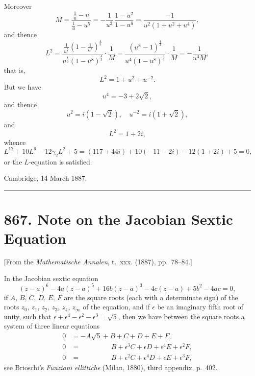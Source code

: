\documentclass[11pt,a4paper]{article}
\theoremstyle{definition}
\begin{document}
Moreover
\[M = \frac{\tfrac{1}{u} - u}{\tfrac{1}{u} - u^5} = -\frac{1}{u^2}\, \frac{1 - u^2}{1 - u^6} = \frac{-1}{u^2(1 + u^2 + u^4)},\]
and thence
\[L^2 = \frac{\tfrac{1}{u^{\frac{8}{3}}}(1 - \tfrac{1}{u^8})^{\frac{4}{3}}}{u^{\frac{8}{3}}(1 - u^8)^{\frac{4}{3}}} \cdot \frac{1}{M} = \frac{(u^8 - 1)^{\frac{4}{3}}}{u^4(1 - u^8)^{\frac{4}{3}}} \cdot \frac{1}{M} = -\frac{1}{u^4M},\]
that is,
\[L^2 = 1 + u^2 + u^{-2}.\]
But we have
\[u^4 = -3 + 2\sqrt{2},\]
and thence
\[u^2 = i(1 - \sqrt{2}), \quad u^{-2} = i(1 + \sqrt{2}),\]
and
\[L^2 = 1 + 2i,\]
whence
\[L^{12} + 10L^6 - 12\gamma_2 L^2 + 5 = (117 + 44i) + 10(-11 - 2i) - 12(1 + 2i) + 5 = 0,\]
or the $L$-equation is satisfied.

\begin{flushright}
Cambridge, 14 March 1887.
\end{flushright}

\vspace{12pt}
\hrule
\vspace{12pt}

\section*{867. Note on the Jacobian Sextic Equation}

\begin{center}
[From the \textit{Mathematische Annalen}, t.~xxx. (1887), pp.~78--84.]
\end{center}

In the Jacobian sextic equation
\[(z - a)^6 - 4a(z - a)^5 + 16b(z - a)^3 - 4c(z - a) + 5b^2 - 4ac = 0,\]
if $A$, $B$, $C$, $D$, $E$, $F$ are the square roots (each with a determinate sign) of the roots $z_0$, $z_1$, $z_2$, $z_3$, $z_4$, $z_\infty$ of the equation, and if $\epsilon$ be an imaginary fifth root of unity, such that $\epsilon + \epsilon^4 - \epsilon^2 - \epsilon^3 = \sqrt{5}$, then we have between the square roots a system of three linear equations
\begin{align*}
0 &= -A\sqrt{5} + B + C + D + E + F, \\
0 &= \phantom{-A\sqrt{5} +}\, B + \epsilon^3 C + \epsilon D + \epsilon^4 E + \epsilon^2 F, \\
0 &= \phantom{-A\sqrt{5} +}\, B + \epsilon^2 C + \epsilon^4 D + \epsilon E + \epsilon^3 F,
\end{align*}
see Brioschi's \textit{Funzioni ellittiche} (Milan, 1880), third appendix, p.~402.
\end{document}
